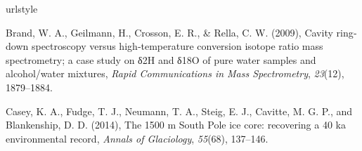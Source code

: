\documentclass[draft, jgrga]{AGUTeX}
\begin{document}
\begin{article}










\begin{thebibliography}{}

\providecommand{\natexlab}[1]{#1}
\expandafter\ifx\csname urlstyle\endcsname\relax
  \providecommand{\doi}[1]{doi:\discretionary{}{}{}#1}\else
  \providecommand{\doi}{doi:\discretionary{}{}{}\begingroup
  \urlstyle{rm}\Url}\fi


 Brand, W. A., Geilmann, H., Crosson, E. R., & Rella, C. W. (2009), Cavity ring‐down spectroscopy versus high‐temperature conversion isotope ratio mass spectrometry; a case study on δ2H and δ18O of pure water samples and alcohol/water mixtures, \textit{Rapid Communications in Mass Spectrometry}, \textit{23}(12), 1879--1884.

 Casey, K. A., Fudge, T. J., Neumann, T. A., Steig, E. J., Cavitte, M. G. P., and Blankenship, D. D. (2014), The 1500 m South Pole ice core: recovering a 40 ka environmental record, \textit{Annals of Glaciology}, \textit{55}(68), 137--146.


\end{thebibliography}
\end{article}
\end{document}
